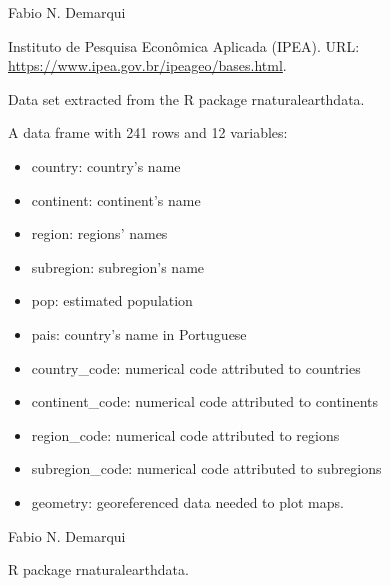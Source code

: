 \documentclass[letterpaper]{book}
\begin{document}
%
\begin{Author}\relax
Fabio N. Demarqui 
\end{Author}
%
\begin{Source}\relax
Instituto de Pesquisa Econômica Aplicada (IPEA). URL: \url{https://www.ipea.gov.br/ipeageo/bases.html}.
\end{Source}
%
\begin{Description}\relax
Data set extracted from the R package rnaturalearthdata.
\end{Description}
%
\begin{Format}
A data frame with 241 rows and 12 variables:
\begin{itemize}

\item{} country: country's name
\item{} continent: continent's name
\item{} region: regions' names
\item{} subregion: subregion's name
\item{} pop: estimated population
\item{} pais: country's name in Portuguese
\item{} country\_code: numerical code attributed to countries
\item{} continent\_code: numerical code attributed to continents
\item{} region\_code: numerical code attributed to regions
\item{} subregion\_code: numerical code attributed to subregions
\item{} geometry: georeferenced data needed to plot maps.

\end{itemize}

\end{Format}
%
\begin{Author}\relax
Fabio N. Demarqui 
\end{Author}
%
\begin{Source}\relax
R package rnaturalearthdata.
\end{Source}
\printindex{}
\end{document}
